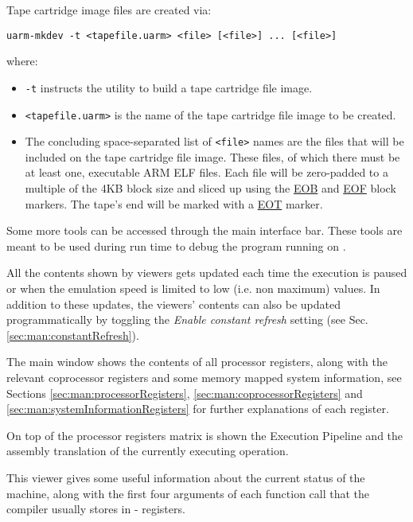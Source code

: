 Tape cartridge image files are created via:

\noindent
\begin{lstlisting}
uarm-mkdev -t <tapefile.uarm> <file> [<file>] ... [<file>]
\end{lstlisting}

\noindent
where:
\begin{itemize}
	\item \texttt{-t} instructs the utility to build a tape cartridge file image.
	\item \texttt{<tapefile.uarm>} is the name of the tape cartridge file image to be created.
	\item  The concluding space-separated list of \texttt{<file>} names are the files that will be included on the tape cartridge file image. 
		These files, of which there must be at least one, executable ARM ELF files.
		Each file will be zero-padded to a multiple of the 4KB block size and sliced up using the \uline{EOB} and \uline{EOF} block markers. 
		The tape’s end will be marked with a \uline{EOT} marker.
\end{itemize}


Some more tools can be accessed through the main interface bar.
These tools are meant to be used during run time to debug the program running on \uarm{}.

All the contents shown by viewers gets updated each time the execution is paused or when the emulation speed is limited to low (i.e. non maximum) values.
In addition to these updates, the viewers' contents can also be updated programmatically by toggling the \emph{Enable constant refresh} setting (see Sec. \ref{sec:man:constantRefresh}).

The main window shows the contents of all processor registers, along with the relevant coprocessor registers and some memory mapped system information, see Sections \ref{sec:man:processorRegisters}, \ref{sec:man:coprocessorRegisters} and \ref{sec:man:systemInformationRegisters} for further explanations of each register.

On top of the processor registers matrix is shown the Execution Pipeline and the assembly translation of the currently executing operation.

This viewer gives some useful information about the current status of the machine, along with the first four arguments of each function call that the compiler usually stores in - registers.

